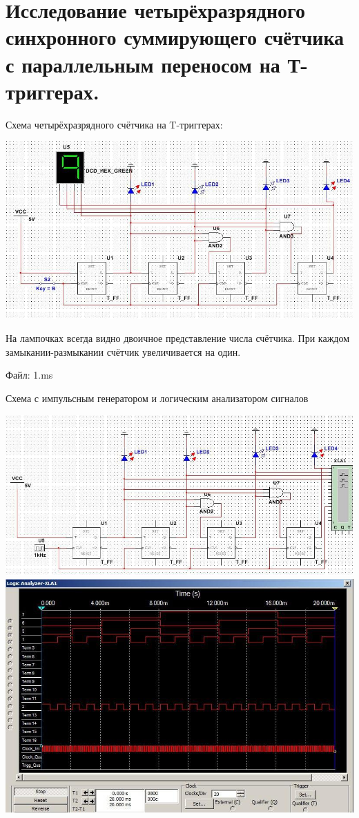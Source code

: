 \documentclass[a4paper,12pt]{article}
\begin{document}
\section{Исследование четырёхразрядного синхронного суммирующего счётчика с параллельным переносом на Т-триггерах.}

Схема четырёхразрядного счётчика на T-триггерах:
\begin{center}
	\includegraphics[scale=0.6]{../screens/1.jpg}
\end{center}

\noindent На лампочках всегда видно двоичное представление числа счётчика. При каждом замыкании-размыкании счётчик увеличивается на один. \newline

\noindent Файл: 1.ms\newline\newline

\noindent Схема с импульсным генератором и логическим анализатором сигналов
\begin{center}
	\includegraphics[scale=0.6]{../screens/2.jpg}
	\includegraphics[scale=0.6]{../screens/2_1.jpg}
\end{center}
\end{document}
